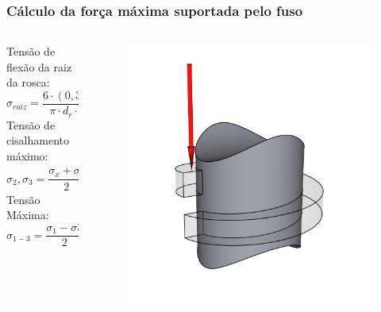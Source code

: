 \begin{frame}
\frametitle{Cálculo da força máxima suportada pelo fuso}
    \begin{columns}
        \begin{column}{0.7\textwidth}
            Tensão de flexão da raiz da rosca:
            $$\sigma_{raiz} = \frac{6 \cdot (0,38 \cdot F)}{\pi \cdot d_{r} \cdot n_{t} \cdot P}$$
            Tensão de cisalhamento máximo:
            $$\sigma_{2}, \sigma_{3} = \frac{\sigma_{x} + \sigma_{y}}{2} \pm \sqrt{(\frac{\sigma_{x} - \sigma_{y}}{2})^2 + \tau_{xy}^{2}}$$
            Tensão Máxima:
            $$\sigma_{1-3} = \frac{\sigma_{1} - \sigma{3}}{2}$$
        \end{column}
        \begin{column}{0.3\textwidth}
            \begin{figure}
                \centering
                \includegraphics[scale = 0.09]{figuras/forcadente}
            \end{figure}
        \end{column}
    \end{columns}
\end{frame}
    